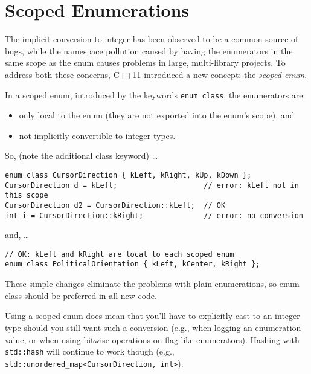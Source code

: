 \section{Scoped Enumerations}\label{sec:scoped-enumerations}
The implicit conversion to integer has been observed to be a common source of bugs, while the namespace pollution caused by having the enumerators in the same scope as the enum causes problems in large, multi-library projects. To address both these concerns, C++11 introduced a new concept: the \emph{scoped enum}.

In a scoped enum, introduced by the keywords \texttt{enum class}, the enumerators are:
\begin{itemize}
    \item only local to the enum (they are not exported into the enum’s scope), and
    \item not implicitly convertible to integer types.
\end{itemize}

So, (note the additional class keyword) …
\begin{verbatim}
enum class CursorDirection { kLeft, kRight, kUp, kDown };
CursorDirection d = kLeft;                    // error: kLeft not in this scope
CursorDirection d2 = CursorDirection::kLeft;  // OK
int i = CursorDirection::kRight;              // error: no conversion
\end{verbatim}
and, …
\begin{verbatim}
// OK: kLeft and kRight are local to each scoped enum
enum class PoliticalOrientation { kLeft, kCenter, kRight };
\end{verbatim}

These simple changes eliminate the problems with plain enumerations, so enum class should be preferred in all new code.

Using a scoped enum does mean that you’ll have to explicitly cast to an integer type should you still want such a conversion (e.g., when logging an enumeration value, or when using bitwise operations on flag-like enumerators). Hashing with \texttt{std::hash} will continue to work though (e.g., \texttt{std::unordered_map<CursorDirection, int>}).

